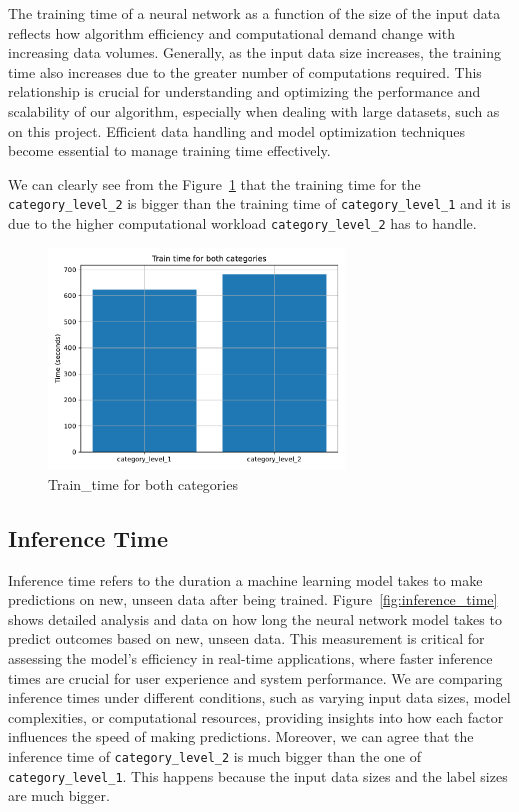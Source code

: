 The training time of a neural network as a function of the size of the input data reflects how algorithm efficiency and computational demand change with increasing data volumes. Generally, as the input data size increases, the training time also increases due to the greater number of computations required. This relationship is crucial for understanding and optimizing the performance and scalability of our algorithm, especially when dealing with large datasets, such as on this project. Efficient data handling and model optimization techniques become essential to manage training time effectively.

We can clearly see from the Figure~\ref{fig:train_time} that the training time for the \verb*|category_level_2| is bigger than the training time of \verb*|category_level_1| and it is due to the higher computational workload \verb*|category_level_2| has to handle.

\begin{figure}[htpb]
	\centering
	\includegraphics[width=0.7\textwidth]{Images/train_time_categories.pdf}
	\caption{Train\_time for both categories}
	\label{fig:train_time}
\end{figure} 

\subsection{Inference Time}
Inference time refers to the duration a machine learning model takes to make predictions on new, unseen data after being trained. Figure~\ref{fig:inference_time} shows detailed analysis and data on how long the neural network model takes to predict outcomes based on new, unseen data. This measurement is critical for assessing the model's efficiency in real-time applications, where faster inference times are crucial for user experience and system performance. We are comparing inference times under different conditions, such as varying input data sizes, model complexities, or computational resources, providing insights into how each factor influences the speed of making predictions.
Moreover, we can agree that the inference time of \verb*|category_level_2| is much bigger than the one of \verb*|category_level_1|. This happens because the input data sizes and the label sizes are much bigger. 

